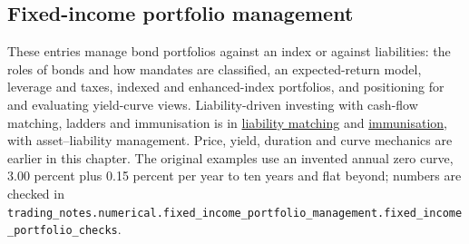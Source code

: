 \subsection{Fixed-income portfolio management}

These entries manage bond portfolios against an index or against liabilities: the roles of bonds and how mandates are classified, an expected-return model, leverage and taxes, indexed and enhanced-index portfolios, and positioning for and evaluating yield-curve views. Liability-driven investing with cash-flow matching, ladders and immunisation is in \hyperref[meth:liability-matching-ladders]{liability matching} and \hyperref[meth:immunisation-liabilities]{immunisation}, with asset--liability management. Price, yield, duration and curve mechanics are earlier in this chapter. The original examples use an invented annual zero curve, 3.00 percent plus 0.15 percent per year to ten years and flat beyond; numbers are checked in \nolinkurl{trading_notes.numerical.fixed_income_portfolio_management.fixed_income_portfolio_checks}.

